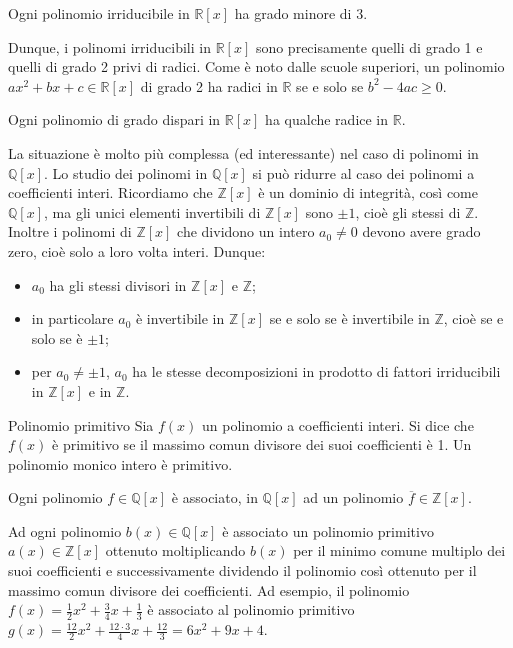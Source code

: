 \begin{teorbox}
	Ogni polinomio irriducibile in $\mathbb{R}[x]$ ha grado minore di 3.
\end{teorbox}


Dunque, i polinomi irriducibili in $\mathbb{R}[x]$ sono precisamente quelli di grado 1 e quelli di grado 2 privi di radici. Come è noto dalle scuole superiori, un polinomio $ax^{2} + bx + c \in \mathbb{R}[x]$ di grado 2 ha radici in $\mathbb{R}$ se e solo se $b^{2}- 4ac \geq 0 $.

\begin{teorbox}[di Bolzano]
	Ogni polinomio di grado dispari in $\mathbb{R}[x]$ ha qualche radice in $\mathbb{R}$.
\end{teorbox}

La situazione è molto più complessa (ed interessante) nel caso di polinomi in $\mathbb{Q}[x]$. Lo studio dei polinomi in $\mathbb{Q}[x]$ si può ridurre al caso dei polinomi a coefficienti interi. Ricordiamo che $\mathbb{Z}[x]$ è un dominio di integrità, così come $\mathbb{Q}[x]$, ma gli unici elementi invertibili di $\mathbb{Z}[x]$ sono $\pm 1$, cioè gli stessi di $\mathbb{Z}$. Inoltre i polinomi di $\mathbb{Z}[x]$ che dividono un intero $a_{0} \neq 0$ devono avere grado zero, cioè solo a loro volta interi. Dunque:
\begin{itemize}
	\item $a_{0}$ ha gli stessi divisori in $\mathbb{Z}[x]$ e $\mathbb{Z}$;
	\item in particolare $a_{0}$ è invertibile in $\mathbb{Z}[x]$ se e solo se è invertibile in $\mathbb{Z}$, cioè se e solo se è $\pm 1$;
	\item per $a_{0} \neq \pm 1$, $a_{0}$ ha le stesse decomposizioni in prodotto di fattori irriducibili in $\mathbb{Z}[x]$ e in $\mathbb{Z}$.
\end{itemize}

\begin{defbox}{Polinomio primitivo}
	Sia $f(x)$ un polinomio a coefficienti interi. Si dice che $f(x)$ è primitivo se il massimo comun divisore dei suoi coefficienti è 1.	Un polinomio monico intero è primitivo.
\end{defbox}

\begin{teorbox}
	Ogni polinomio $f \in \mathbb{Q}[x]$ è associato, in $\mathbb{Q}[x]$ ad un polinomio $\overline{f} \in \mathbb{Z}[x]$.
\end{teorbox}

\begin{example}
	Ad ogni polinomio $b(x) \in \mathbb{Q}[x]$ è associato un polinomio primitivo $a(x) \in \mathbb{Z}[x]$ ottenuto moltiplicando $b(x)$ per il minimo comune multiplo dei suoi coefficienti e successivamente dividendo il polinomio così ottenuto per il massimo comun divisore dei coefficienti. Ad esempio, il polinomio $f(x) = \frac{1}{2}x^{2}+\frac{3}{4}x+\frac{1}{3}$ è associato al polinomio primitivo $g(x) = \frac{12}{2}x^{2}+\frac{12 \cdot 3}{4}x+\frac{12}{3}=6x^{2}+9x+4$.
\end{example}

